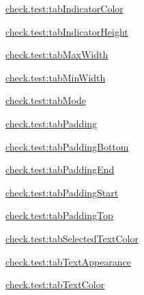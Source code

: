 {\ttfamily \hyperlink{classcheck_1_1test_1_1_r_1_1styleable_abe4a618bcb92a95c54007a1a200f0279}{check.\+test\+:tab\+Indicator\+Color}}

{\ttfamily \hyperlink{classcheck_1_1test_1_1_r_1_1styleable_aca78b1820fbcf57d71fd51391a7c0bf0}{check.\+test\+:tab\+Indicator\+Height}}

{\ttfamily \hyperlink{classcheck_1_1test_1_1_r_1_1styleable_a53f614a296e5bfb7bb73efa8b8b97a85}{check.\+test\+:tab\+Max\+Width}}

{\ttfamily \hyperlink{classcheck_1_1test_1_1_r_1_1styleable_aa3b9b9d3b5f02ead0c41b9100556ca2a}{check.\+test\+:tab\+Min\+Width}}

{\ttfamily \hyperlink{classcheck_1_1test_1_1_r_1_1styleable_a88d621242008fb6057c34ed8469247ae}{check.\+test\+:tab\+Mode}}

{\ttfamily \hyperlink{classcheck_1_1test_1_1_r_1_1styleable_a6426fde2392c9bb8c68b9824ba4a31d5}{check.\+test\+:tab\+Padding}}

{\ttfamily \hyperlink{classcheck_1_1test_1_1_r_1_1styleable_aca2df98e251a1a4ec4ae92a5fbd6d93d}{check.\+test\+:tab\+Padding\+Bottom}}

{\ttfamily \hyperlink{classcheck_1_1test_1_1_r_1_1styleable_ac49de9adbf423ca62f717d2cad3f8e55}{check.\+test\+:tab\+Padding\+End}}

{\ttfamily \hyperlink{classcheck_1_1test_1_1_r_1_1styleable_a680abf2e357062993996fc1cf323e63a}{check.\+test\+:tab\+Padding\+Start}}

{\ttfamily \hyperlink{classcheck_1_1test_1_1_r_1_1styleable_a17d7a02e6dcc33c6369bab9530248be5}{check.\+test\+:tab\+Padding\+Top}}

{\ttfamily \hyperlink{classcheck_1_1test_1_1_r_1_1styleable_a8de68a289b7ff055235fa32b1699d7c0}{check.\+test\+:tab\+Selected\+Text\+Color}}

{\ttfamily \hyperlink{classcheck_1_1test_1_1_r_1_1styleable_a72cd16a486f24d8a85c804b159034a9b}{check.\+test\+:tab\+Text\+Appearance}}

{\ttfamily \hyperlink{classcheck_1_1test_1_1_r_1_1styleable_a904165c0c64b601cb32165f90094f08d}{check.\+test\+:tab\+Text\+Color}}

